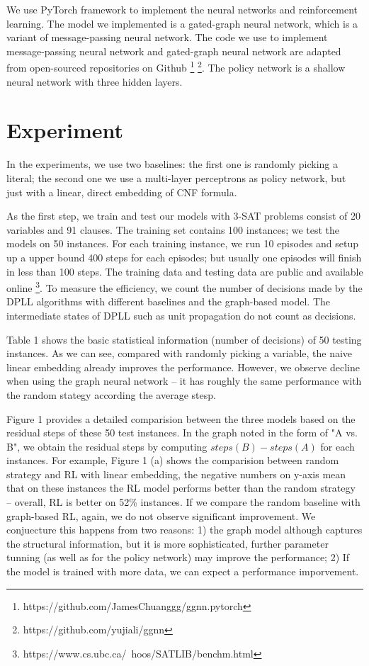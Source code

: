 \documentclass[sigplan,10pt]{acmart}\settopmatter{printfolios=true,printccs=false,printacmref=false}
\begin{document}
We use PyTorch framework to implement the neural networks and reinforcement learning.
The model we implemented is a gated-graph neural network, which is a variant of message-passing neural network.
The code we use to implement message-passing neural network and gated-graph neural network 
are adapted from open-sourced repositories on Github 
\footnote{https://github.com/JamesChuanggg/ggnn.pytorch} 
\footnote{https://github.com/yujiali/ggnn}.
The policy network is a shallow neural network with three hidden layers.

\section{Experiment}

In the experiments, we use two baselines: the first one is randomly picking a literal; 
the second one we use a multi-layer perceptrons as policy network, but just with 
a linear, direct embedding of CNF formula.

As the first step, we train and test our models with 3-SAT problems consist of 
20 variables and 91 clauses. The training set contains 100 instances; we test
the models on 50 instances. For each training instance, we run 10 episodes and 
setup up a upper bound 400 steps for each episodes; but usually one episodes 
will finish in less than 100 steps.
The training data and testing data are public and available online 
\footnote{https://www.cs.ubc.ca/~hoos/SATLIB/benchm.html}.
To measure the efficiency, we count the number of decisions made by the DPLL algorithms 
with different baselines and the graph-based model. 
The intermediate states of DPLL such as unit propagation do not count as decisions.

Table 1 shows the basic statistical information (number of decisions) of 50 testing instances.
As we can see, compared with randomly picking a variable, 
the naive linear embedding already improves the performance.
However, we observe decline when using the graph neural network -- it has roughly the same
performance with the random stategy according the average stesp.

Figure 1 provides a detailed comparision between the three models based on the residual 
steps of these 50 test instances. In the graph noted in the form of "A vs. B", we obtain
the residual steps by computing $steps(B) - steps(A)$ for each instances.
For example, Figure 1 (a) shows the comparision between random strategy and RL with linear 
embedding, the negative numbers on y-axis mean that on these instances the RL model performs
better than the random strategy -- overall, RL is better on 52\% instances.
If we compare the random baseline with graph-based RL, again, we do not observe
significant improvement. We conjuecture this happens from two reasons: 
1) the graph model although captures the structural information, but it is more 
sophisticated, further parameter tunning (as well as for the policy network) 
may improve the performance;
2) If the model is trained with more data, we can expect a performance imporvement.
\end{document}
